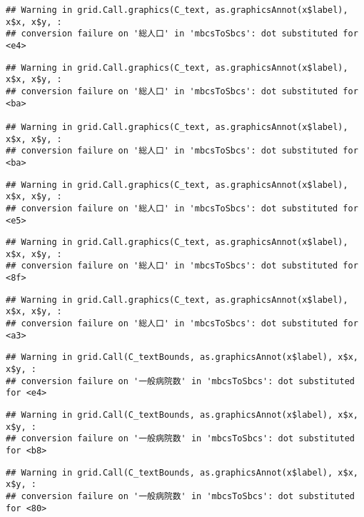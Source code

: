 \documentclass[
]{article}
\begin{document}
\begin{verbatim}
## Warning in grid.Call.graphics(C_text, as.graphicsAnnot(x$label), x$x, x$y, :
## conversion failure on '総人口' in 'mbcsToSbcs': dot substituted for <e4>
\end{verbatim}

\begin{verbatim}
## Warning in grid.Call.graphics(C_text, as.graphicsAnnot(x$label), x$x, x$y, :
## conversion failure on '総人口' in 'mbcsToSbcs': dot substituted for <ba>

## Warning in grid.Call.graphics(C_text, as.graphicsAnnot(x$label), x$x, x$y, :
## conversion failure on '総人口' in 'mbcsToSbcs': dot substituted for <ba>
\end{verbatim}

\begin{verbatim}
## Warning in grid.Call.graphics(C_text, as.graphicsAnnot(x$label), x$x, x$y, :
## conversion failure on '総人口' in 'mbcsToSbcs': dot substituted for <e5>
\end{verbatim}

\begin{verbatim}
## Warning in grid.Call.graphics(C_text, as.graphicsAnnot(x$label), x$x, x$y, :
## conversion failure on '総人口' in 'mbcsToSbcs': dot substituted for <8f>
\end{verbatim}

\begin{verbatim}
## Warning in grid.Call.graphics(C_text, as.graphicsAnnot(x$label), x$x, x$y, :
## conversion failure on '総人口' in 'mbcsToSbcs': dot substituted for <a3>
\end{verbatim}

\begin{verbatim}
## Warning in grid.Call(C_textBounds, as.graphicsAnnot(x$label), x$x, x$y, :
## conversion failure on '一般病院数' in 'mbcsToSbcs': dot substituted for <e4>
\end{verbatim}

\begin{verbatim}
## Warning in grid.Call(C_textBounds, as.graphicsAnnot(x$label), x$x, x$y, :
## conversion failure on '一般病院数' in 'mbcsToSbcs': dot substituted for <b8>
\end{verbatim}

\begin{verbatim}
## Warning in grid.Call(C_textBounds, as.graphicsAnnot(x$label), x$x, x$y, :
## conversion failure on '一般病院数' in 'mbcsToSbcs': dot substituted for <80>
\end{verbatim}
\end{document}
